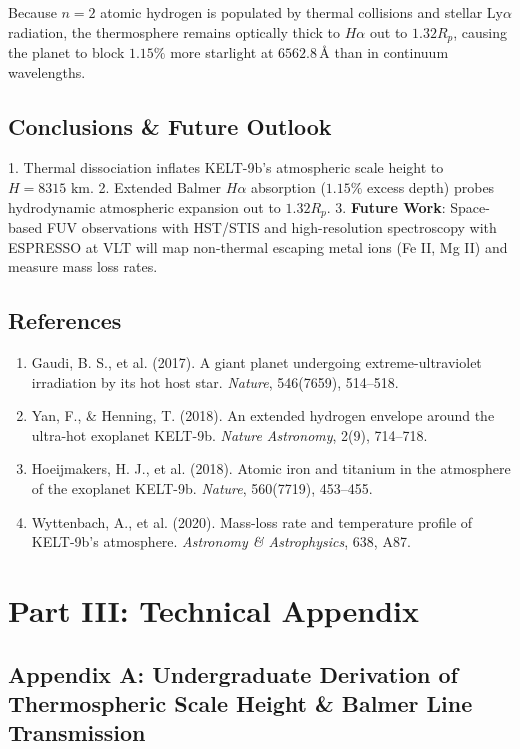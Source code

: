 \documentclass[11pt,a4paper]{article}
\begin{document}
Because $n=2$ atomic hydrogen is populated by thermal collisions and stellar Ly$\alpha$ radiation, the thermosphere remains optically thick to $H\alpha$ out to $1.32 R_p$, causing the planet to block $1.15\%$ more starlight at $6562.8\,\text{\AA}$ than in continuum wavelengths.

\subsection{Conclusions \& Future Outlook}
1. Thermal dissociation inflates KELT-9b's atmospheric scale height to $H = 8315\text{ km}$.
2. Extended Balmer $H\alpha$ absorption ($1.15\%$ excess depth) probes hydrodynamic atmospheric expansion out to $1.32 R_p$.
3. \textbf{Future Work}: Space-based FUV observations with HST/STIS and high-resolution spectroscopy with ESPRESSO at VLT will map non-thermal escaping metal ions (Fe II, Mg II) and measure mass loss rates.

\subsection*{References}
\begin{enumerate}
    \item Gaudi, B. S., et al. (2017). A giant planet undergoing extreme-ultraviolet irradiation by its hot host star. \textit{Nature}, 546(7659), 514--518.
    \item Yan, F., \& Henning, T. (2018). An extended hydrogen envelope around the ultra-hot exoplanet KELT-9b. \textit{Nature Astronomy}, 2(9), 714--718.
    \item Hoeijmakers, H. J., et al. (2018). Atomic iron and titanium in the atmosphere of the exoplanet KELT-9b. \textit{Nature}, 560(7719), 453--455.
    \item Wyttenbach, A., et al. (2020). Mass-loss rate and temperature profile of KELT-9b's atmosphere. \textit{Astronomy \& Astrophysics}, 638, A87.
\end{enumerate}

\newpage

\section*{Part III: Technical Appendix}

\subsection*{Appendix A: Undergraduate Derivation of Thermospheric Scale Height \& Balmer Line Transmission}
\end{document}
